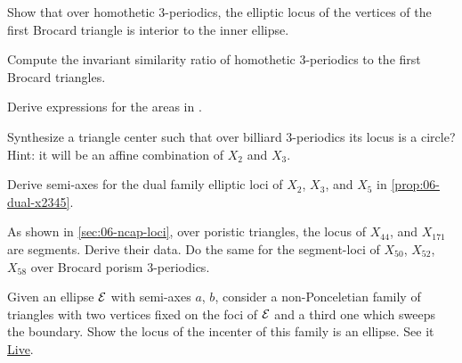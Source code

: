 \begin{exercise}
Show that over homothetic 3-periodics, the elliptic locus of the vertices of the first Brocard triangle is interior to the inner ellipse.
\end{exercise}

\begin{exercise}
Compute the invariant similarity ratio of homothetic 3-periodics to the first Brocard triangles. 
\end{exercise}

\begin{exercise}
Derive expressions for the areas in \label{cor:06-equi-areas}.
\end{exercise}

\begin{exercise}
Synthesize a triangle center such that over billiard 3-periodics its locus is a circle? Hint: it will be an affine combination of $X_2$ and $X_3$.
\end{exercise}

\begin{exercise}
Derive semi-axes for the dual family elliptic loci of $X_2$, $X_3$, and $X_5$ in \cref{prop:06-dual-x2345}.
\end{exercise}

\begin{exercise}
As shown in \cref{sec:06-ncap-loci}, over poristic triangles, the locus of $X_{44}$, and $X_{171}$ are segments. Derive their data. Do the same for the segment-loci of $X_{50}$, $X_{52}$, $X_{58}$ over Brocard porism 3-periodics.
\end{exercise}

\begin{exercise}
Given an ellipse $\mathcal{E}$ with semi-axes $a$, $b$, consider a non-Ponceletian family of triangles with two vertices fixed on the foci of $\mathcal{E}$ and a third one which sweeps the boundary. Show the locus of the incenter of this family is an ellipse. See it \href{https://bit.ly/3up4a6V}{Live}.
\end{exercise}

